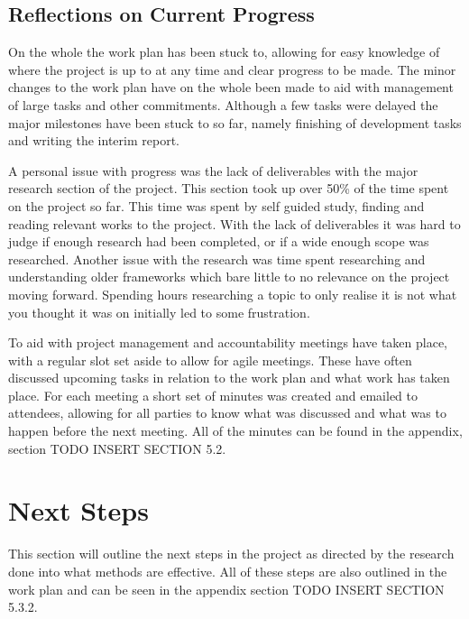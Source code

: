 \documentclass[a4paper]{article}
\begin{document}
\subsection{Reflections on Current Progress}
On the whole the work plan has been stuck to, allowing for easy knowledge of where the project is up to at any time and clear progress to be made.
The minor changes to the work plan have on the whole been made to aid with management of large tasks and other commitments.
Although a few tasks were delayed the major milestones have been stuck to so far, namely finishing of development tasks and writing the interim report.
\par
A personal issue with progress was the lack of deliverables with the major research section of the project.
This section took up over 50\% of the time spent on the project so far.
This time was spent by self guided study, finding and reading relevant works to the project.
With the lack of deliverables it was hard to judge if enough research had been completed, or if a wide enough scope was researched.
Another issue with the research was time spent researching and understanding older frameworks which bare little to no relevance on the project moving forward.
Spending hours researching a topic to only realise it is not what you thought it was on initially led to some frustration.
\par
To aid with project management and accountability meetings have taken place, with a regular slot set aside to allow for agile meetings.
These have often discussed upcoming tasks in relation to the work plan and what work has taken place.
For each meeting a short set of minutes was created and emailed to attendees, allowing for all parties to know what was discussed and what was to happen before the next meeting.
All of the minutes can be found in the appendix, section TODO INSERT SECTION 5.2.

\section{Next Steps}
This section will outline the next steps in the project as directed by the research done into what methods are effective.
All of these steps are also outlined in the work plan and can be seen in the appendix section TODO INSERT SECTION 5.3.2.
\end{document}
